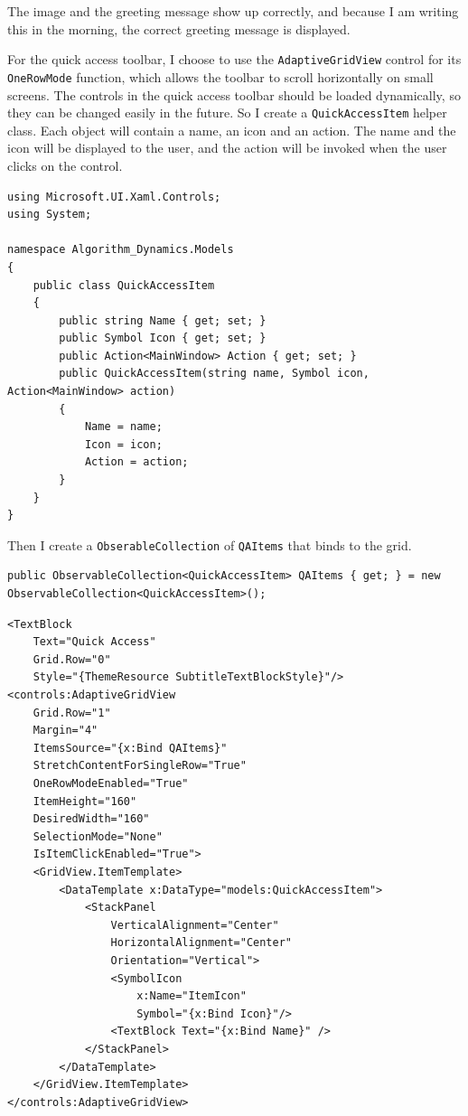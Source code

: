 \documentclass[a4paper]{report}
\newcommand{\code}{\texttt}
\begin{document}
The image and the greeting message show up correctly, and because I am writing this in the morning, the correct greeting message is displayed.

For the quick access toolbar, I choose to use the \code{AdaptiveGridView} control for its \code{OneRowMode} function, which allows the toolbar to scroll horizontally on small screens. The controls in the quick access toolbar should be loaded dynamically, so they can be changed easily in the future. So I create a \code{QuickAccessItem} helper class. Each object will contain a name, an icon and an action. The name and the icon will be displayed to the user, and the action will be invoked when the user clicks on the control.

\begin{verbatim}
using Microsoft.UI.Xaml.Controls;
using System;

namespace Algorithm_Dynamics.Models
{
    public class QuickAccessItem
    {
        public string Name { get; set; }
        public Symbol Icon { get; set; }
        public Action<MainWindow> Action { get; set; }
        public QuickAccessItem(string name, Symbol icon, Action<MainWindow> action)
        {
            Name = name;
            Icon = icon;
            Action = action;
        }
    }
}
\end{verbatim}

Then I create a \code{ObserableCollection} of \code{QAItems} that binds to the grid.

\begin{verbatim}
public ObservableCollection<QuickAccessItem> QAItems { get; } = new ObservableCollection<QuickAccessItem>();
\end{verbatim}

\begin{verbatim}
<TextBlock 
    Text="Quick Access"
    Grid.Row="0"
    Style="{ThemeResource SubtitleTextBlockStyle}"/>
<controls:AdaptiveGridView 
    Grid.Row="1"
    Margin="4"
    ItemsSource="{x:Bind QAItems}"
    StretchContentForSingleRow="True"
    OneRowModeEnabled="True"
    ItemHeight="160"
    DesiredWidth="160"
    SelectionMode="None"
    IsItemClickEnabled="True">
    <GridView.ItemTemplate>
        <DataTemplate x:DataType="models:QuickAccessItem">
            <StackPanel 
                VerticalAlignment="Center"
                HorizontalAlignment="Center"
                Orientation="Vertical">
                <SymbolIcon 
                    x:Name="ItemIcon"
                    Symbol="{x:Bind Icon}"/>
                <TextBlock Text="{x:Bind Name}" />
            </StackPanel>
        </DataTemplate>
    </GridView.ItemTemplate>
</controls:AdaptiveGridView>
\end{verbatim}
\end{document}
